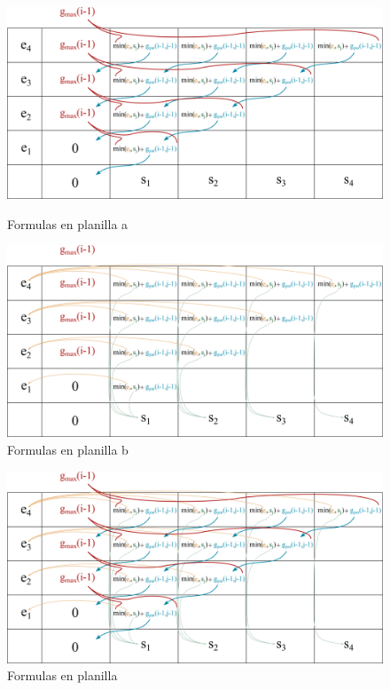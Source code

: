 \begin{figure}[ht]
    \centering
    \begin{minipage}[b]{0.495\textwidth}
        \centering
        \includegraphics[width=\textwidth]{img/formulas_planilla_1.png}
        \caption{Formulas en planilla a}
        \label{fig:formulas_planilla_1}
    \end{minipage}
    \begin{minipage}[b]{0.495\textwidth}
        \centering
        \includegraphics[width=\textwidth]{img/formulas_planilla_2.png}
        \caption{Formulas en planilla b}
        \label{fig:formulas_planilla_2}
    \end{minipage}
\end{figure}

\begin{figure}[H]
    \centering
    \includegraphics[width=1\textwidth]{img/planilla_completa.png}
    \caption{Formulas en planilla}
    \label{fig:planilla_completa}
\end{figure}

